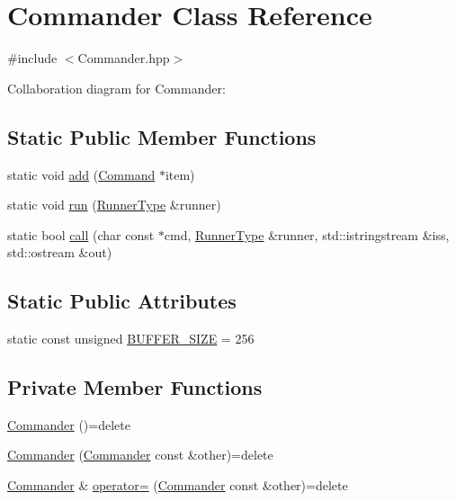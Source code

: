 \hypertarget{classCommander}{}\section{Commander Class Reference}
\label{classCommander}


{\ttfamily \#include $<$Commander.\+hpp$>$}



Collaboration diagram for Commander\+:
\subsection*{Static Public Member Functions}
\begin{DoxyCompactItemize}
\item 
static void \hyperlink{classCommander_a467f6a4ceeb5dab750cf3f4821b5db90}{add} (\hyperlink{classCommand}{Command} $\ast$item)
\item 
static void \hyperlink{classCommander_afea1bfe2bc8dbeea0d0523f369c9539e}{run} (\hyperlink{Command_8hpp_ad45c3de597c2023a8be0399d914161f4}{Runner\+Type} \&runner)
\item 
static bool \hyperlink{classCommander_a28323e9560f01aba51869d54832ca987}{call} (char const $\ast$cmd, \hyperlink{Command_8hpp_ad45c3de597c2023a8be0399d914161f4}{Runner\+Type} \&runner, std\+::istringstream \&iss, std\+::ostream \&out)
\end{DoxyCompactItemize}
\subsection*{Static Public Attributes}
\begin{DoxyCompactItemize}
\item 
static const unsigned \hyperlink{classCommander_a9e1b32d844b2d8080e51c4e8a4ca0442}{B\+U\+F\+F\+E\+R\+\_\+\+S\+I\+ZE} = 256
\end{DoxyCompactItemize}
\subsection*{Private Member Functions}
\begin{DoxyCompactItemize}
\item 
\hyperlink{classCommander_accd2048a7f1b8aa3a2b362493d546495}{Commander} ()=delete
\item 
\hyperlink{classCommander_aaf951ebc1b2909dbdccfb3ab7bd80b0d}{Commander} (\hyperlink{classCommander}{Commander} const \&other)=delete
\item 
\hyperlink{classCommander}{Commander} \& \hyperlink{classCommander_a505015f2c954a48742acec695d1559dc}{operator=} (\hyperlink{classCommander}{Commander} const \&other)=delete
\end{DoxyCompactItemize}
